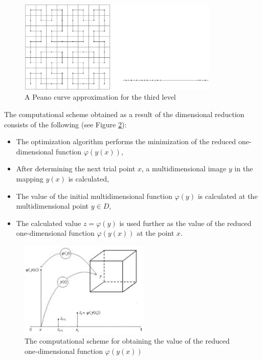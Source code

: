 \documentclass{gOMS2e}
\theoremstyle{plain}%
\theoremstyle{definition}
\theoremstyle{remark}
\begin{document}
\begin{figure}[h!]
    \centering
		\includegraphics[width=0.85\textwidth]{pictures/peanoC.eps}
		\caption{A Peano curve approximation for the third level}
    \label{fig:peanoC}
\end{figure}

\par
The computational scheme obtained as a result of the dimensional reduction consists of the following (see Figure \ref{fig:peanoCUsage}):
\begin{itemize}
  \item The optimization algorithm performs the minimization of the reduced one-dimensional function \(\varphi(y(x))\),
  \item After determining the next trial point \(x\), a multidimensional image \(y\) in the mapping \(y(x)\) is calculated,
  \item The value of the initial multidimensional function \(\varphi(y)\) is calculated at the multidimensional point \(y\in D\),
  \item The calculated value \(z=\varphi(y)\) is used further as the value of the reduced one-dimensional function \(\varphi(y(x))\) at the point \(x\).
\end{itemize}

\begin{figure}[h!]
    \centering
		\includegraphics[width=0.55\textwidth]{pictures/peanoCUsage.eps}
		\caption{The computational scheme for obtaining the value of the reduced one-dimensional function \(\varphi(y(x))\)}
    \label{fig:peanoCUsage}
\end{figure}
\end{document}
